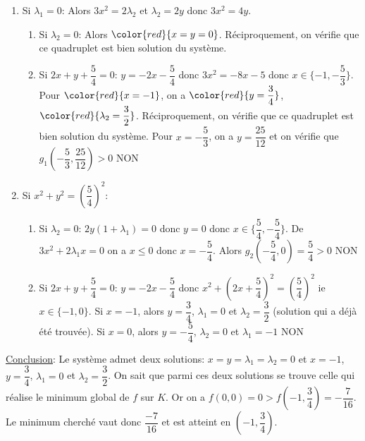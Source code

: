 \documentclass{fancybook}
\begin{document}
\begin{enumerate}
\item Si $\lambda_1=0$: \newline
Alors $3x^2=2\lambda_2$ et $\lambda_2=2y$ donc $3x^2=4y$.
\begin{enumerate}
\item Si $\lambda_2=0$:\newline
Alors $\color{red}{x=y=0}$. Réciproquement, on vérifie que ce quadruplet est bien solution du système.
\item Si $2x+y+\dfrac{5}{4}=0$: \newline
$y=-2x-\dfrac{5}{4}$ donc $3x^2=-8x-5$ donc $x\in \{-1,-\dfrac 53\}$.\newline
Pour $\color{red}{x=-1}$, on a $\color{red}{y=\dfrac 34}$, $\color{red}{\lambda_2 = \dfrac 32}$. Réciproquement, on vérifie que ce quadruplet est bien solution du système.\newline
Pour $x=-\dfrac 53$, on a $y=\dfrac{25}{12}$ et on vérifie que $g_1(-\dfrac 53, \dfrac{25}{12})>0$ NON
\end{enumerate}
\item Si $x^2+y^2= \left(\dfrac{5}{4}\right)^2$: \newline
\begin{enumerate}
\item Si $\lambda_2=0$:\newline 
$2y(1+\lambda_1)=0$ donc $y=0$ donc $x\in \{\dfrac 54, -\dfrac 54\}$.\newline
De $3x^2+2\lambda_1x=0$ on a $x\leq 0$ donc $x=-\dfrac 54$.\newline
Alors $g_2(-\dfrac 54, 0) = \dfrac 54>0$ NON
\item Si $2x+y+\dfrac 54=0$: \newline
$y=-2x-\dfrac 54$ donc $x^2+(2x+\dfrac 54)^2=\left(\dfrac 54 \right)^2$ ie $x\in \{-1,0\}$.\newline
Si $x=-1$, alors $y=\dfrac 34$, $\lambda_1=0$ et $\lambda_2=\dfrac 32$ (solution qui a déjà été trouvée). \newline
Si $x=0$, alors $y=-\dfrac 54$, $\lambda_2=0$ et $\lambda_1=-1$ NON
\end{enumerate}
\end{enumerate}
\underline{Conclusion}: Le système admet deux solutions: $x=y=\lambda_1=\lambda_2=0$ et $x=-1$, $y=\dfrac 34$, $\lambda_1=0$ et $\lambda_2=\dfrac 32$. On sait que parmi ces deux solutions se trouve celle qui réalise le minimum global de $f$ sur $K$. Or on a $f(0,0)=0>f(-1,\dfrac 34)=-\dfrac{7}{16}$. Le minimum cherché vaut donc $\dfrac{-7}{16}$ et est atteint en $(-1,\dfrac 34)$.\newline
\end{document}
